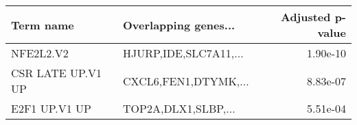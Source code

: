 \begin{tabular}{llr}
\toprule
        Term name &  Overlapping genes... &  Adjusted p-value \\
\midrule
        NFE2L2.V2 & HJURP,IDE,SLC7A11,... &          1.90e-10 \\
CSR LATE UP.V1 UP &  CXCL6,FEN1,DTYMK,... &          8.83e-07 \\
    E2F1 UP.V1 UP &   TOP2A,DLX1,SLBP,... &          5.51e-04 \\
\bottomrule
\end{tabular}
